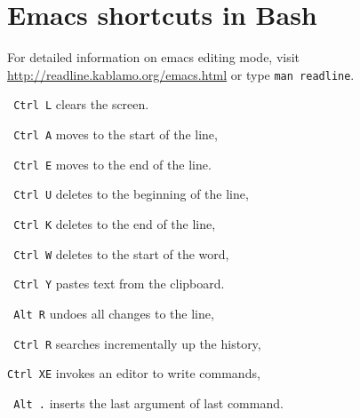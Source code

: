 \section{Emacs shortcuts in Bash}
For detailed information on emacs editing mode, visit \url{http://readline.kablamo.org/emacs.html} or type \texttt{man readline}.

\begin{compactenum}
\item [\texttt{ Ctrl L}] clears the screen.
\item []
\item [\texttt{ Ctrl A}] moves to the start of the line,
\item [\texttt{ Ctrl E}] moves to the end of the line.
\item []
\item [\texttt{ Ctrl U}] deletes to the beginning of the line,
\item [\texttt{ Ctrl K}] deletes to the end of the line,
\item [\texttt{ Ctrl W}] deletes to the start of the word,
\item [\texttt{ Ctrl Y}] pastes text from the clipboard.
\item []
\item [\texttt{ {} Alt R}] undoes all changes to the line,
\item [\texttt{ Ctrl R}] searches incrementally up the history,
\item [\texttt{Ctrl XE}] invokes an editor to write commands,
\item [\texttt{ {} Alt .}] inserts the last argument of last command.
\end{compactenum}